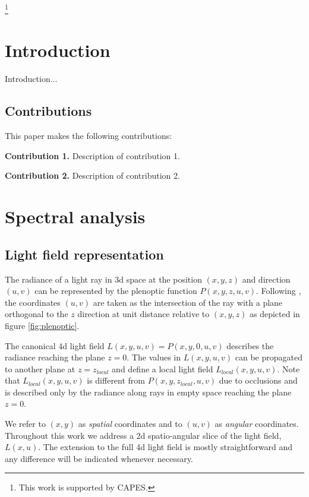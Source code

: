 \documentclass[acmtog,review,anonymous]{acmart}
\begin{document}
\thanks{This work is supported by CAPES.}

\maketitle

\section{Introduction}

Introduction...

\subsection{Contributions}

This paper makes the following contributions:

\textbf{Contribution 1.} Description of contribution 1.

\textbf{Contribution 2.} Description of contribution 2.

\section{Spectral analysis}

\subsection{Light field representation}

The radiance of a light ray in 3d space at the position $(x, y, z)$ and direction $(u, v)$ can be represented by the plenoptic function $P(x, y, z, u, v)$. Following \cite{Chai:2000:PS:344779.344932}, the coordinates $(u, v)$ are taken as the intersection of the ray with a plane orthogonal to the $z$ direction at unit distance relative to $(x, y, z)$ as depicted in figure \ref{fig:plenoptic}.

The canonical 4d light field $L(x, y, u, v) = P(x, y, 0, u, v)$ describes the radiance reaching the plane $z = 0$. The values in $L(x, y, u, v)$ can be propagated to another plane at $z = z_{local}$ and define a local light field $L_{local}(x, y, u, v)$. Note that $L_{local}(x, y, u, v)$ is different from $P(x, y, z_{local}, u, v)$ due to occlusions and is described only by the radiance along rays in empty space reaching the plane $z = 0$.

We refer to $(x, y)$ as \emph{spatial} coordinates and to $(u, v)$ as \emph{angular} coordinates. Throughout this work we address a 2d spatio-angular slice of the light field, $L(x, u)$. The extension to the full 4d light field is mostly straightforward and any difference will be indicated whenever necessary.
\end{document}
